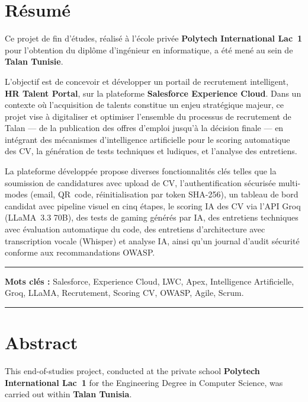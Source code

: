\chapter*{Résumé}

Ce projet de fin d'études, réalisé à l'école privée \textbf{Polytech International Lac~1} pour l'obtention du diplôme d'ingénieur en informatique, a été mené au sein de \textbf{Talan Tunisie}.

\medskip

L'objectif est de concevoir et développer un portail de recrutement intelligent, \textbf{HR Talent Portal}, sur la plateforme \textbf{Salesforce Experience Cloud}. Dans un contexte où l'acquisition de talents constitue un enjeu stratégique majeur, ce projet vise à digitaliser et optimiser l'ensemble du processus de recrutement de Talan --- de la publication des offres d'emploi jusqu'à la décision finale --- en intégrant des mécanismes d'intelligence artificielle pour le scoring automatique des CV, la génération de tests techniques et ludiques, et l'analyse des entretiens.

\medskip

La plateforme développée propose diverses fonctionnalités clés telles que la soumission de candidatures avec upload de CV, l'authentification sécurisée multi-modes (email, QR~code, réinitialisation par token SHA-256), un tableau de bord candidat avec pipeline visuel en cinq étapes, le scoring IA des CV via l'API Groq (LLaMA~3.3 70B), des tests de gaming générés par IA, des entretiens techniques avec évaluation automatique du code, des entretiens d'architecture avec transcription vocale (Whisper) et analyse IA, ainsi qu'un journal d'audit sécurité conforme aux recommandations OWASP.

\vspace{1cm}

\noindent\rule[2pt]{\textwidth}{0.5pt}

{\textbf{Mots clés :}}
Salesforce, Experience Cloud, LWC, Apex, Intelligence Artificielle, Groq, LLaMA, Recrutement, Scoring CV, OWASP, Agile, Scrum.
\\
\noindent\rule[2pt]{\textwidth}{0.5pt}

\clearpage

\chapter*{Abstract}

This end-of-studies project, conducted at the private school \textbf{Polytech International Lac~1} for the Engineering Degree in Computer Science, was carried out within \textbf{Talan Tunisia}.

